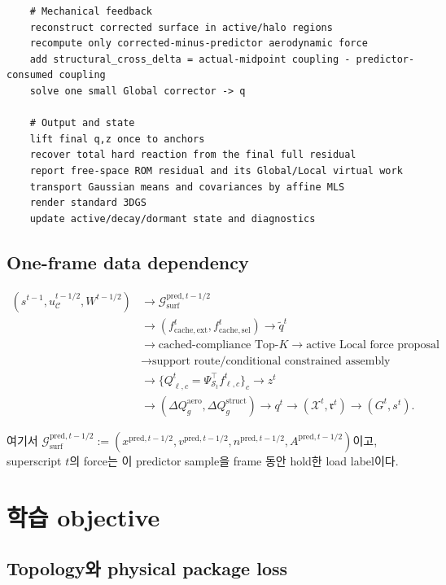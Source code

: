 \documentclass[11pt,a4paper]{article}
\begin{document}
\begin{lstlisting}
    # Mechanical feedback
    reconstruct corrected surface in active/halo regions
    recompute only corrected-minus-predictor aerodynamic force
    add structural_cross_delta = actual-midpoint coupling - predictor-consumed coupling
    solve one small Global corrector -> q

    # Output and state
    lift final q,z once to anchors
    recover total hard reaction from the final full residual
    report free-space ROM residual and its Global/Local virtual work
    transport Gaussian means and covariances by affine MLS
    render standard 3DGS
    update active/decay/dormant state and diagnostics
\end{lstlisting}

\subsection{One-frame data dependency}

\begin{equation}
\boxed{
\begin{aligned}
(s^{t-1},u_{\mathcal C}^{t-1/2},W^{t-1/2})
&\rightarrow \mathcal G_{\mathrm{surf}}^{\mathrm{pred},t-1/2}\\
&\rightarrow (f_{\mathrm{cache,ext}}^t,f_{\mathrm{cache,sel}}^t)
\rightarrow \widetilde q^t\\
&\rightarrow \text{cached-compliance Top-}K
\rightarrow \text{active Local force proposal}\\
&\rightarrow \text{support route/conditional constrained assembly}\\
&\rightarrow \{Q_{\ell,c}^t=\Psi_{\mathcal S_t}^\top f_{\ell,c}^t\}_c
\rightarrow z^t\\
&\rightarrow
(\Delta Q_g^{\mathrm{aero}},\Delta Q_g^{\mathrm{struct}})
\rightarrow q^t
\rightarrow (\mathcal X^t,\mathfrak r^t)
\rightarrow (G^t,s^t).
\end{aligned}
}
\end{equation}

여기서
\(\mathcal G_{\mathrm{surf}}^{\mathrm{pred},t-1/2}
:=(x^{\mathrm{pred},t-1/2},v^{\mathrm{pred},t-1/2},
n^{\mathrm{pred},t-1/2},A^{\mathrm{pred},t-1/2})\)이고,
superscript \(t\)의 force는 이 predictor sample을 frame 동안 hold한 load label이다.

\section{학습 objective}

\subsection{Topology와 physical package loss}
\end{document}
